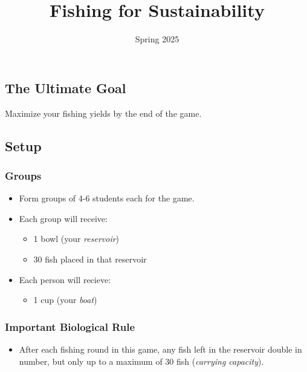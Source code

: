 \documentclass[]{tufte-handout}
\title[Sustainable Yield Activity]{Fishing for Sustainability}
\date{Spring 2025}
\providecommand{\tightlist}{%
  \setlength{\itemsep}{0pt}\setlength{\parskip}{0pt}}
\begin{document}
\maketitle




\subsection{The Ultimate Goal}\label{the-ultimate-goal}

Maximize your fishing yields by the end of the game.

\subsection{Setup}\label{setup}

\subsubsection{Groups}\label{groups}

\begin{itemize}
\tightlist
\item
  Form groups of 4-6 students each for the game.
\item
  Each group will receive:

  \begin{itemize}
  \tightlist
  \item
    1 bowl (your \emph{reservoir})
  \item
    30 fish placed in that reservoir
  \end{itemize}
\item
  Each person will recieve:

  \begin{itemize}
  \tightlist
  \item
    1 cup (your \emph{boat})
  \end{itemize}
\end{itemize}

\subsubsection{Important Biological
Rule}\label{important-biological-rule}

\begin{itemize}
\tightlist
\item
  After each fishing round in this game, any fish left in the reservoir
  double in number, but only up to a maximum of 30 fish (\emph{carrying
  capacity}).
\end{itemize}
\end{document}
